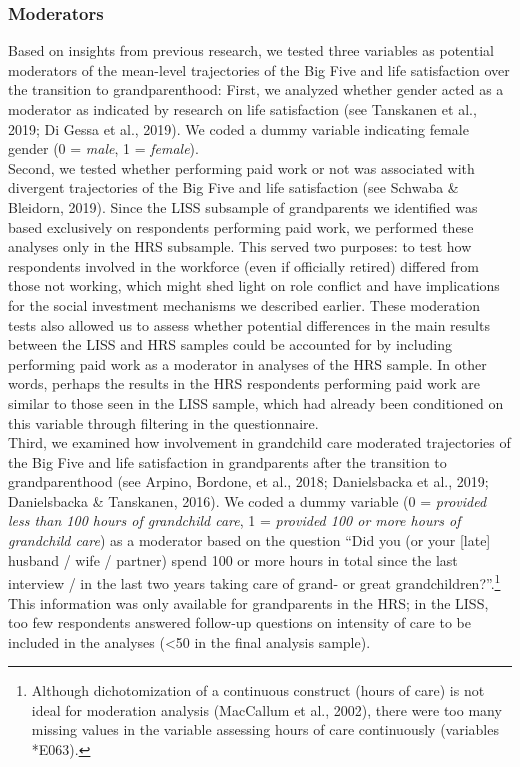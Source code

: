 \documentclass[
  english,
  man, noextraspace]{apa7}
\begin{document}
\hypertarget{moderators}{%
\subsubsection{Moderators}\label{moderators}}

Based on insights from previous research, we tested three variables as potential moderators of the mean-level trajectories of the Big Five and life satisfaction over the transition to grandparenthood: First, we analyzed whether gender acted as a moderator as indicated by research on life satisfaction (see Tanskanen et al., 2019; Di Gessa et al., 2019). We coded a dummy variable indicating female gender (0 = \emph{male}, 1 = \emph{female}).\\
Second, we tested whether performing paid work or not was associated with divergent trajectories of the Big Five and life satisfaction (see Schwaba \& Bleidorn, 2019). Since the LISS subsample of grandparents we identified was based exclusively on respondents performing paid work, we performed these analyses only in the HRS subsample. This served two purposes: to test how respondents involved in the workforce (even if officially retired) differed from those not working, which might shed light on role conflict and have implications for the social investment mechanisms we described earlier. These moderation tests also allowed us to assess whether potential differences in the main results between the LISS and HRS samples could be accounted for by including performing paid work as a moderator in analyses of the HRS sample. In other words, perhaps the results in the HRS respondents performing paid work are similar to those seen in the LISS sample, which had already been conditioned on this variable through filtering in the questionnaire.\\
Third, we examined how involvement in grandchild care moderated trajectories of the Big Five and life satisfaction in grandparents after the transition to grandparenthood (see Arpino, Bordone, et al., 2018; Danielsbacka et al., 2019; Danielsbacka \& Tanskanen, 2016). We coded a dummy variable (0 = \emph{provided less than 100 hours of grandchild care}, 1 = \emph{provided 100 or more hours of grandchild care}) as a moderator based on the question \enquote{Did you (or your {[}late{]} husband / wife / partner) spend 100 or more hours in total since the last interview / in the last two years taking care of grand- or great grandchildren?}.\footnote{Although dichotomization of a continuous construct (hours of care) is not ideal for moderation analysis (MacCallum et al., 2002), there were too many missing values in the variable assessing hours of care continuously (variables *E063).} This information was only available for grandparents in the HRS; in the LISS, too few respondents answered follow-up questions on intensity of care to be included in the analyses (\textless50 in the final analysis sample).
\end{document}
